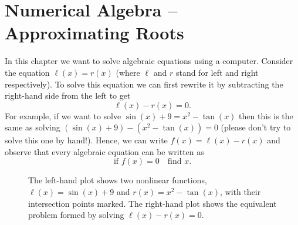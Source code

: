 \chapter{Numerical Algebra -- Approximating Roots}
In this chapter we want to solve algebraic equations using a computer.  Consider the equation
$\ell(x) = r(x)$ (where $\ell$ and $r$ stand for left and right respectively).  To solve
this equation we can first rewrite it by subtracting the right-hand side from the left to
get
\[ \ell(x) - r(x) = 0. \]
For example, if we want to solve $\sin(x) + 9 = x^2 - \tan(x)$ then this is the same as
solving $(\sin(x) + 9 ) - (x^2 - \tan(x)) = 0$ (please don't try to solve this one by
hand!).  Hence, we can write $f(x)=\ell(x)-r(x)$
and observe that every algebraic equation can be written as
\[ \text{if } f(x) = 0 \quad \text{find } x. \]

\begin{figure}[ht!]
    \begin{center}
    \end{center}
    \caption{The left-hand plot shows two nonlinear functions, $\ell(x) = \sin(x) + 9$ and
        $r(x) = x^2 - \tan(x)$, with their intersection points marked. The right-hand plot
    shows the equivalent problem formed by solving $\ell(x) - r(x) = 0$.}
    \label{fig:initial_root_example}
\end{figure}

